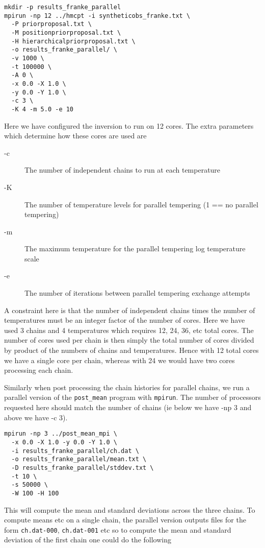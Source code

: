 \documentclass[a4paper,12pt]{article}
\begin{document}
\begin{verbatim}
mkdir -p results_franke_parallel
mpirun -np 12 ../hmcpt -i syntheticobs_franke.txt \
  -P priorproposal.txt \
  -M positionpriorproposal.txt \
  -H hierarchicalpriorproposal.txt \
  -o results_franke_parallel/ \
  -v 1000 \
  -t 100000 \
  -A 0 \
  -x 0.0 -X 1.0 \
  -y 0.0 -Y 1.0 \
  -c 3 \
  -K 4 -m 5.0 -e 10
\end{verbatim}

Here we have configured the inversion to run on 12 cores. The extra parameters which
determine how these cores are used are

\begin{description}
\item[-c] The number of independent chains to run at each temperature
\item[-K] The number of temperature levels for parallel tempering (1 == no parallel tempering)
\item[-m] The maximum temperature for the parallel tempering log temperature scale
\item[-e] The number of iterations between parallel tempering exchange attempts
\end{description}

A constraint here is that the number of independent chains times the
number of temperatures must be an integer factor of the number of
cores. Here we have used 3 chains and 4 temperatures which requires
12, 24, 36, etc total cores. The number of cores used per chain is
then simply the total number of cores divided by product of the
numbers of chains and temperatures. Hence with 12 total cores we have
a single core per chain, whereas with 24 we would have two cores
processing each chain.

Similarly when post processing the chain histories for parallel chains,
we run a parallel version of the \texttt{post\_mean} program with
\texttt{mpirun}. The number of processors requested here should match
the number of chains (ie below we have -np 3 and above we have -c 3).

\begin{verbatim}
mpirun -np 3 ../post_mean_mpi \
  -x 0.0 -X 1.0 -y 0.0 -Y 1.0 \
  -i results_franke_parallel/ch.dat \
  -o results_franke_parallel/mean.txt \
  -D results_franke_parallel/stddev.txt \
  -t 10 \
  -s 50000 \
  -W 100 -H 100
\end{verbatim}

This will compute the mean and standard deviations across the three
chains. To compute means etc on a single chain, the parallel version
outputs files for the form \texttt{ch.dat-000}, \texttt{ch.dat-001} etc
so to compute the mean and standard deviation of the first chain one could do the
following
\end{document}

